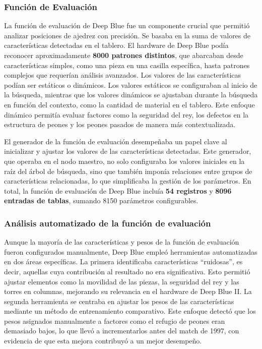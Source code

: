 \documentclass[12pt,a4paper]{article}
\begin{document}
\subsubsection{Función de Evaluación}

La función de evaluación de Deep Blue fue un componente crucial que permitió analizar posiciones de ajedrez con precisión. Se basaba en la suma de valores de características detectadas en el tablero. El hardware de Deep Blue podía reconocer aproximadamente \textbf{8000 patrones distintos}, que abarcaban desde características simples, como una pieza en una casilla específica, hasta patrones complejos que requerían análisis avanzados. Los valores de las características podían ser estáticos o dinámicos. Los valores estáticos se configuraban al inicio de la búsqueda, mientras que los valores dinámicos se ajustaban durante la búsqueda en función del contexto, como la cantidad de material en el tablero. Este enfoque dinámico permitía evaluar factores como la seguridad del rey, los defectos en la estructura de peones y los peones pasados de manera más contextualizada.

El generador de la función de evaluación desempeñaba un papel clave al inicializar y ajustar los valores de las características detectadas. Este generador, que operaba en el nodo maestro, no solo configuraba los valores iniciales en la raíz del árbol de búsqueda, sino que también imponía relaciones entre grupos de características relacionadas, lo que simplificaba la gestión de los parámetros. En total, la función de evaluación de Deep Blue incluía \textbf{54 registros} y \textbf{8096 entradas de tablas}, sumando 8150 parámetros configurables.

\subsubsection*{Análisis automatizado de la función de evaluación}
Aunque la mayoría de las características y pesos de la función de evaluación fueron configurados manualmente, Deep Blue empleó herramientas automatizadas en dos áreas específicas. La primera identificaba características “ruidosas”, es decir, aquellas cuya contribución al resultado no era significativa. Esto permitió ajustar elementos como la movilidad de las piezas, la seguridad del rey y las torres en columnas, mejorando su relevancia en el hardware de Deep Blue II. La segunda herramienta se centraba en ajustar los pesos de las características mediante un método de entrenamiento comparativo. Este enfoque detectó que los pesos asignados manualmente a factores como el refugio de peones eran demasiado bajos, lo que llevó a incrementarlos antes del match de 1997, con evidencia de que esta mejora contribuyó a un mejor desempeño.
\end{document}
